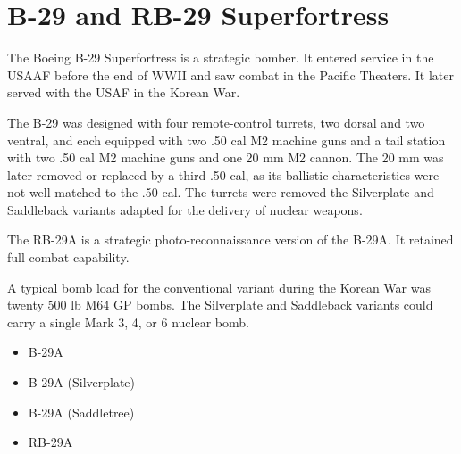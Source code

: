 \section*{B-29 and RB-29 Superfortress}

The Boeing B-29 Superfortress is a strategic bomber. It entered service in the USAAF before the end of WWII and saw combat in the Pacific Theaters. It later served with the USAF in the Korean War.

The B-29 was designed with four remote-control turrets, two dorsal and two ventral, and each equipped with two .50 cal M2 machine guns and a tail station with two .50 cal M2 machine guns and one 20 mm M2 cannon. The 20 mm was later removed or replaced by a third .50 cal, as its ballistic characteristics were not well-matched to the .50 cal. The turrets were removed the Silverplate and Saddleback variants adapted for the delivery of nuclear weapons. 

The RB-29A is a strategic photo-reconnaissance version of the B-29A. It retained full combat capability.

A typical bomb load for the conventional variant during the Korean War was twenty 500 lb M64 GP bombs. The Silverplate and Saddleback variants could carry a single Mark 3, 4, or 6 nuclear bomb.

\begin{itemize}
\item B-29A
\item B-29A (Silverplate)
\item B-29A (Saddletree)
\item RB-29A
\end{itemize}
